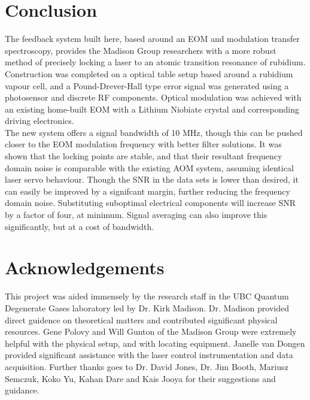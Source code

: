 \newpage
\section{Conclusion}

The feedback system built here, based around an EOM and modulation transfer spectroscopy, provides the Madison Group researchers with a more robust method of precisely locking a laser to an atomic transition resonance of rubidium. \\

Construction was completed on a optical table setup based around a rubidium vapour cell, and a Pound-Drever-Hall type error signal was generated using a photosensor and discrete RF components. Optical modulation was achieved with an existing home-built EOM with a Lithium Niobiate crystal and corresponding driving electronics.\\

The new system offers a signal bandwidth of 10 MHz, though this can be pushed closer to the EOM modulation frequency with better filter solutions. It was shown that the locking points are stable, and that their resultant frequency domain noise is comparable with the existing AOM system, assuming identical laser servo behaviour. Though the SNR in the data sets is lower than desired, it can easily be improved by a signifcant margin, further reducing the frequency domain noise. Substituting suboptimal electrical components will increase SNR by a factor of four, at minimum. Signal averaging can also improve this significantly, but at a cost of bandwidth.

\section*{Acknowledgements}

This project was aided immensely by the research staff in the UBC Quantum Degenerate Gases laboratory led by Dr. Kirk Madison. Dr. Madison provided direct guidence on theoretical matters and contributed significant physical resources. Gene Polovy and Will Gunton of the Madison Group were extremely helpful with the physical setup, and with locating equipment. Janelle van Dongen provided significant assistance with the laser control instrumentation and data acquisition. Further thanks goes to Dr. David Jones, Dr. Jim Booth, Mariusz Semczuk, Koko Yu, Kahan Dare and Kais Jooya for their suggestions and guidance.